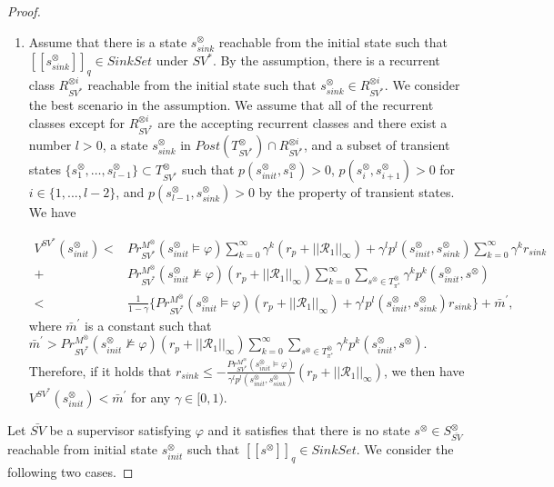 \documentclass[10pt]{article}
\theoremstyle{definition}
\newcommand{\myspq}{\ensuremath{[\![s^{\otimes}]\!]}_q}
\newcommand{\myspqsink}{\ensuremath{[\![s^{\otimes}_{sink}]\!]}_q}
\begin{document}
\begin{proof}
\begin{enumerate}
  \item Assume that there is a state $s^{\otimes}_{sink}$ reachable from the initial state such that $\myspqsink \in SinkSet$ under $SV^{\ast}$. By the assumption, there is a recurrent class $R^{\otimes i}_{SV^{\ast}}$ reachable from the initial state such that $s^{\otimes}_{sink} \in R^{\otimes i}_{SV^{\ast}}$. We consider the best scenario in the assumption. We assume that all of the recurrent classes except for $R^{\otimes i}_{SV^{\ast}}$ are the accepting recurrent classes and there exist a number $l > 0$, a state $s^{\otimes}_{sink}$ in $Post(T^{\otimes}_{SV^{\ast}}) \cap R^{\otimes i}_{SV^{\ast}}$, and a subset of transient states $\{ s^{\otimes}_1, \ldots , s^{\otimes}_{l-1} \} \subset T^{\otimes}_{SV^{\ast}}$ such that $p(s^{\otimes}_{init}, s^{\otimes}_1)>0$, $p(s^{\otimes}_{i}, s^{\otimes}_{i+1})>0$ for $i \in \{ 1,...,l-2 \}$, and $p(s^{\otimes}_{l-1}, s^{\otimes}_{sink})>0$ by the property of transient states. We have

  \begin{align}
    V^{SV^{\ast}}(s^{\otimes}_{init}) < & Pr^{M^{\otimes}}_{SV^{\ast}}(s^{\otimes}_{init} \models \varphi) \sum_{k=0}^{\infty} \gamma^k (r_p + ||\mathcal{R}_1||_{\infty}) + \gamma^l p^l(s^{\otimes}_{init}, s^{\otimes}_{sink}) \sum_{k=0}^{\infty} \gamma^k r_{sink} \nonumber \\
    + & Pr^{M^{\otimes}}_{SV^{\ast}}(s^{\otimes}_{init} \not\models \varphi) (r_p + ||\mathcal{R}_1||_{\infty}) \sum_{k=0}^{\infty} \sum_{s^{\otimes} \in T^{\otimes}_{\pi^{\ast}}} \gamma^k p^k(s^{\otimes}_{init}, s^{\otimes}) \nonumber \\
    < & \frac{1}{1-\gamma} \{ Pr^{M^{\otimes}}_{SV^{\ast}}(s^{\otimes}_{init} \models \varphi) (r_p + ||\mathcal{R}_1||_{\infty}) + \gamma^l p^l (s^{\otimes}_{init}, s^{\otimes}_{sink}) r_{sink} \} + \bar{m}^{\prime}, \nonumber
  \end{align}
  where $\bar{m}^{\prime}$ is a constant such that $\bar{m}^{\prime} > Pr^{M^{\otimes}}_{SV^{\ast}}(s^{\otimes}_{init} \not\models \varphi) (r_p + ||\mathcal{R}_1||_{\infty}) \sum_{k=0}^{\infty} \sum_{s^{\otimes} \in T^{\otimes}_{\pi^{\ast}}} \gamma^k p^k(s^{\otimes}_{init}, s^{\otimes})$.
  Therefore, if it holds that $r_{sink} \leq - \frac{Pr^{M^{\otimes}}_{SV^{\ast}}(s^{\otimes}_{init} \models \varphi)}{ \gamma^l p^l (s^{\otimes}_{init}, s^{\otimes}_{sink})} (r_p + ||\mathcal{R}_1||_{\infty})$, we then have $V^{SV^{\ast}}(s^{\otimes}_{init}) < \bar{m}^{\prime}$ for any $\gamma \in [0,1)$.

\end{enumerate}
  Let $\bar{SV}$ be a supervisor satisfying $\varphi$ and it satisfies that there is no state $s^{\otimes} \in S^{\otimes}_{\bar{SV}}$ reachable from initial state $s^{\otimes}_{init}$ such that $\myspq \in SinkSet$. We consider the following two cases.


\end{proof}
\end{document}
